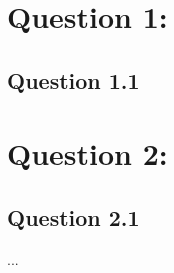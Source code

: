 \section*{Question 1:}

\subsection*{Question 1.1 }

\section*{Question 2: }

\subsection*{Question 2.1 }

...